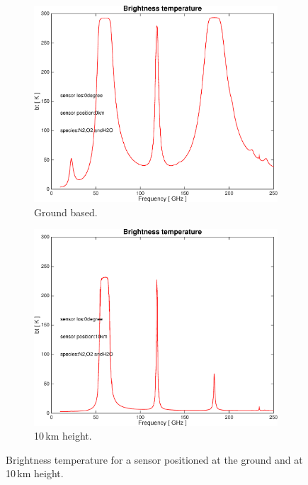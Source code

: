 \documentclass[paper=a4, fontsize=11pt]{scrartcl} %
\begin{document}
\begin{figure}[h]
  \centering
  \begin{subfigure}[h!]{0.45\textwidth}
    \includegraphics[width=\textwidth]{plots/bt_N2+O2+H2O_0km_0deg.pdf}
    \caption{Ground based.}
    \end{subfigure}
    \hfill    
    \begin{subfigure}[h!]{0.45\textwidth}
    \includegraphics[width=\textwidth]{plots/bt_N2+O2+H2O_10km_0deg.pdf}
    \caption{10\,km height.}
    \end{subfigure}
  \caption{Brightness temperature for a sensor positioned at the ground and at
    10\,km height.}
  \label{figure:abs_pressure}
\end{figure}
\end{document}
